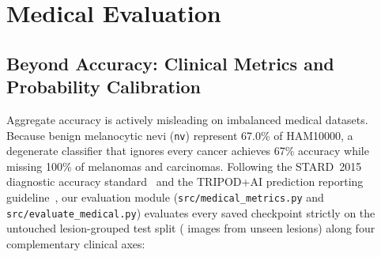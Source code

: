 \section{Medical Evaluation}
\label{sec:medical_evaluation}

\subsection{Beyond Accuracy: Clinical Metrics and Probability Calibration}
Aggregate accuracy is actively misleading on imbalanced medical datasets. Because benign melanocytic nevi (\texttt{nv}) represent 67.0\% of HAM10000, a degenerate classifier that ignores every cancer achieves 67\% accuracy while missing 100\% of melanomas and carcinomas. Following the STARD~2015 diagnostic accuracy standard~\cite{Bossuyt2015stard} and the TRIPOD+AI prediction reporting guideline~\cite{Collins2024tripod}, our evaluation module (\texttt{src/medical\_metrics.py} and \texttt{src/evaluate\_medical.py}) evaluates every saved checkpoint strictly on the untouched lesion-grouped test split (\WSixTestImgs{} images from \WSixTestLesions{} unseen lesions) along four complementary clinical axes:

